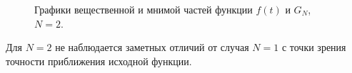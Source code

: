 \documentclass[a5paper, 10pt]{article}
\theoremstyle{definition}
\theoremstyle{plain}
\theoremstyle{remark}
\begin{document}
\begin{figure}[h]
\begin{minipage}[h]{0.5\linewidth}
\end{minipage}
\hfill
\begin{minipage}[h]{0.5\linewidth}
\end{minipage}
\caption{Графики вещественной и мнимой частей функции $f(t)$ и $G_N$, $N=2$.}
\end{figure}

\newpage
Для $N=2$ не наблюдается заметных отличий от случая $N=1$ с точки зрения точности приближения исходной функции.
\end{document}
